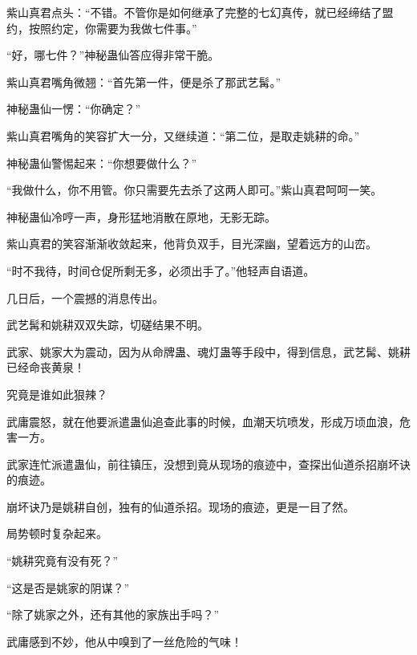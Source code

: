 \begin{this_body}
紫山真君点头：“不错。不管你是如何继承了完整的七幻真传，就已经缔结了盟约，按照约定，你需要为我做七件事。”

“好，哪七件？”神秘蛊仙答应得非常干脆。

紫山真君嘴角微翘：“首先第一件，便是杀了那武艺髯。”

神秘蛊仙一愣：“你确定？”

紫山真君嘴角的笑容扩大一分，又继续道：“第二位，是取走姚耕的命。”

神秘蛊仙警惕起来：“你想要做什么？”

“我做什么，你不用管。你只需要先去杀了这两人即可。”紫山真君呵呵一笑。

神秘蛊仙冷哼一声，身形猛地消散在原地，无影无踪。

紫山真君的笑容渐渐收敛起来，他背负双手，目光深幽，望着远方的山峦。

“时不我待，时间仓促所剩无多，必须出手了。”他轻声自语道。

几日后，一个震撼的消息传出。

武艺髯和姚耕双双失踪，切磋结果不明。

武家、姚家大为震动，因为从命牌蛊、魂灯蛊等手段中，得到信息，武艺髯、姚耕已经命丧黄泉！

究竟是谁如此狠辣？

武庸震怒，就在他要派遣蛊仙追查此事的时候，血潮天坑喷发，形成万顷血浪，危害一方。

武家连忙派遣蛊仙，前往镇压，没想到竟从现场的痕迹中，查探出仙道杀招崩坏诀的痕迹。

崩坏诀乃是姚耕自创，独有的仙道杀招。现场的痕迹，更是一目了然。

局势顿时复杂起来。

“姚耕究竟有没有死？”

“这是否是姚家的阴谋？”

“除了姚家之外，还有其他的家族出手吗？”

武庸感到不妙，他从中嗅到了一丝危险的气味！

\end{this_body}

